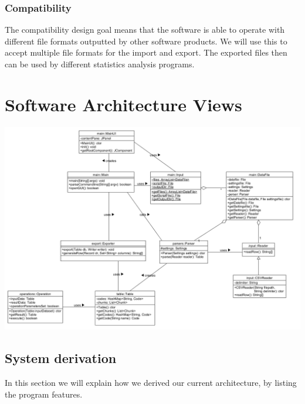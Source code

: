 \documentclass[11pt,twoside,a4paper]{article}
\begin{document}
\subsubsection{Compatibility}
The compatibility design goal means that the software is able to operate with different file formats outputted by other software products. We will use this to accept multiple file formats for the import and export. The exported files then can be used by different statistics analysis programs.
\newpage
\section{Software Architecture Views}

\includegraphics[scale=0.7, center]{Class_diagram.PNG}

\subsection{System derivation}
In this section we will explain how we derived our current architecture, by listing the program features.
\end{document}
